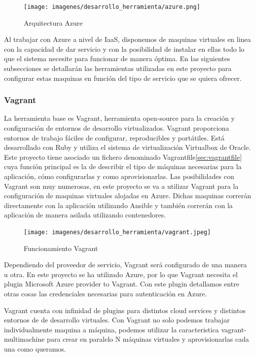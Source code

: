 \documentclass[a4paper,11pt]{book}
\begin{document}
\begin{figure}[H] 
\centering 
\texttt{[image: imagenes/desarrollo\_herramienta/azure.png]}
\caption{ Arquitectura Azure\cite{azureA}  }  
\end{figure}

Al trabajar con Azure a nivel de IaaS, disponemos de maquinas virtuales en linea con la capacidad de dar servicio y con la posibilidad de instalar en ellas todo lo que el sistema necesite para funcionar de manera óptima. En las siguientes subsecciones se detallarán las herramientas utilizadas en este proyecto para configurar estas maquinas en función del tipo de servicio que se quiera ofrecer. 

\subsubsection{Vagrant}

La herramienta base es Vagrant\cite{vg}, herramienta open-source para la creación y configuración de entornos de desarrollo virtualizados. Vagrant proporciona entornos de trabajo fáciles de configurar, reproducibles y portátiles. Está desarrollado con Ruby y utiliza el sistema de virtualización Virtualbox de Oracle. Este proyecto tiene asociado un fichero denominado Vagrantfile\ref{sec:vagrantfile} cuya función principal es la de describir el tipo de máquinas necesarias para la aplicación, cómo configurarlas y como aprovisionarlas. Las posibilidades con Vagrant son muy numerosas, en este proyecto se va a utilizar Vagrant para la configuración de maquinas virtuales alojadas en Azure. Dichas maquinas correrán directamente con la aplicación utilizando Ansible y también correrán con la aplicación de manera asilada utilizando contenedores. 

\begin{figure}[H] 
\centering 
\texttt{[image: imagenes/desarrollo\_herramienta/vagrant.jpeg]}
\caption{ Funcionamiento Vagrant\cite{vg2}}
\end{figure}


Dependiendo del proveedor de servicio, Vagrant será configurado de una manera u otra. En este proyecto se ha utilizado Azure, por lo que Vagrant necesita el plugin Microsoft Azure provider to Vagrant. Con este plugin detallamos entre otras cosas las credenciales necesarias para autenticación en Azure.

Vagrant cuenta con infinidad de plugins para distintos cloud services y distintos entornos de de desarrollo virtuales. Con Vagrant no solo podemos trabajar individualmente maquina a máquina, podemos utilizar la caracteristica vagrant-multimachine para crear en paralelo N máquinas virtuales y aprovisionarlas cada una como queramos. 
\end{document}
